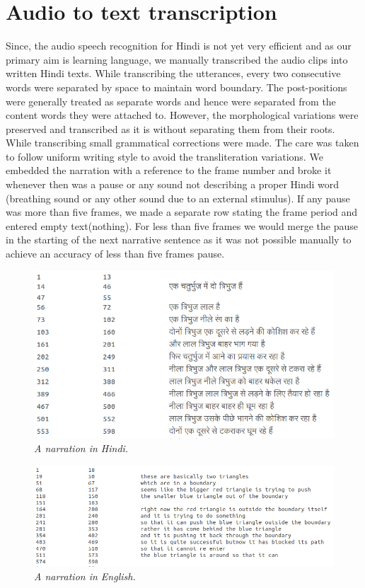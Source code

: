 \documentclass[12pt, a4paper]{report}
\begin{document}
\section{Audio to text transcription}

Since, the audio speech recognition for Hindi is not yet very efficient and as our primary aim is learning language, we manually transcribed the audio clips into written Hindi texts. While transcribing the utterances, every two consecutive words were separated by space to maintain word boundary. The post-positions were generally treated as separate words and hence were separated from the content words they were attached to. However, the morphological variations were preserved and transcribed as it is without separating them from their roots. While transcribing small grammatical corrections were made. The care was taken to follow uniform writing style to avoid the transliteration variations. We embedded the narration with a reference to the frame number and broke it whenever then was a pause or any sound not describing a proper Hindi word (breathing sound or any other sound due to an external stimulus). If any pause was more than five frames, we made a separate row stating the frame period and entered empty text(nothing). For less than five frames we would merge the pause in the starting of the next narrative sentence as it was not possible manually to achieve an accuracy of less than five frames pause.

\begin{figure}[!t]
\centering
\includegraphics[width=5in]{HN.png}
\caption{\small \sl A narration in Hindi.}
\label{fig_FSM}
\end{figure}

\begin{figure}[!t]
\centering
\includegraphics[width=5in]{EN.png}
\caption{\small \sl A narration in English.}
\label{fig_FSM}
\end{figure}
\end{document}
